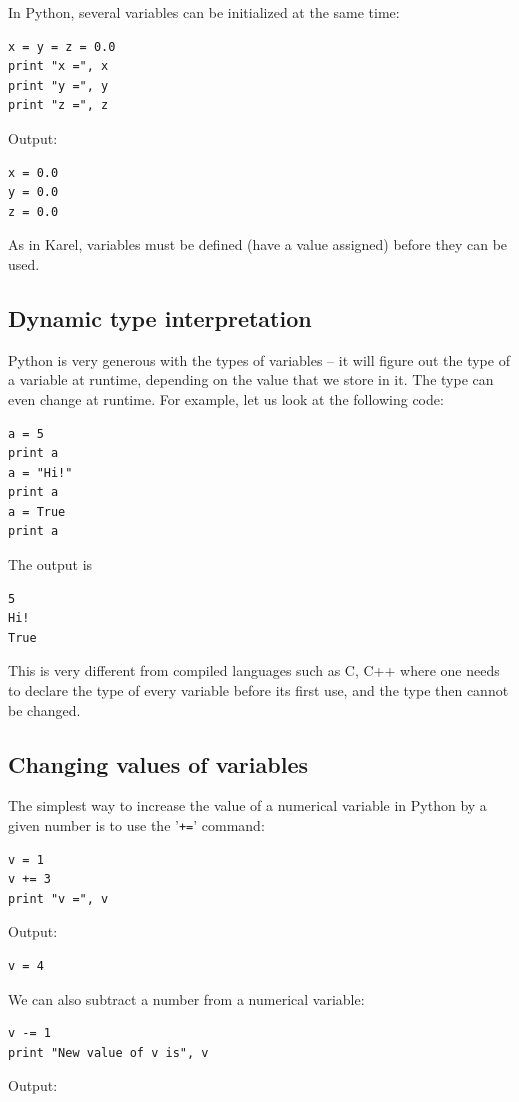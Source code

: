In Python, several variables can be initialized at the same time:

\begin{verbatim}
x = y = z = 0.0
print "x =", x
print "y =", y
print "z =", z
\end{verbatim}
Output:

\begin{verbatim}
x = 0.0
y = 0.0
z = 0.0
\end{verbatim}
As in Karel, variables must be defined (have a value assigned) before they can be 
used. 

\subsection{Dynamic type interpretation}

Python is very generous with the types of variables -- it will figure out the type of a variable 
at runtime, depending on the value that we store in it. The type can even change at runtime.
For example, let us look at the following code:

\begin{verbatim}
a = 5
print a
a = "Hi!"
print a
a = True
print a
\end{verbatim}
The output is 

\begin{verbatim}
5
Hi!
True
\end{verbatim}
This is very different from compiled languages such as C, C++ where one needs to declare the type 
of every variable before its first use, and the type then cannot be changed. 

\subsection{Changing values of variables}

The simplest way to increase the value of a numerical variable in Python by a given number 
is to use the '{\tt +=}' command:

\begin{verbatim}
v = 1
v += 3
print "v =", v
\end{verbatim}
Output:

\begin{verbatim}
v = 4
\end{verbatim}
We can also subtract a number from a numerical variable:

\begin{verbatim}
v -= 1
print "New value of v is", v
\end{verbatim}
Output:

